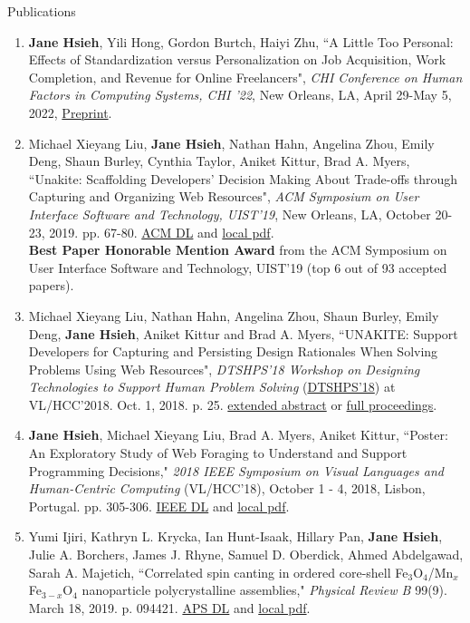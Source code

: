 \documentclass{resume}
\begin{document}
\begin{rSection}{Publications}
\begin{enumerate}
    \item \textbf{Jane Hsieh}, Yili Hong, Gordon Burtch, Haiyi Zhu, ``A Little Too Personal: Effects of Standardization versus Personalization on Job Acquisition, Work Completion, and Revenue for Online Freelancers", \textit{CHI Conference on Human Factors in Computing Systems, CHI ’22}, New Orleans, LA, April 29-May 5, 2022, \href{}{Preprint}.
    \item Michael Xieyang Liu, \textbf{Jane Hsieh}, Nathan Hahn, Angelina Zhou, Emily Deng, Shaun Burley, Cynthia Taylor, Aniket Kittur, Brad A. Myers, ``Unakite: Scaffolding Developers’ Decision Making About Trade-offs through Capturing and Organizing Web Resources", \textit{ACM Symposium on User Interface Software and Technology, UIST'19}, New Orleans, LA, October 20-23, 2019. pp. 67-80. \href{https://dl.acm.org/citation.cfm?id=3347908}{ACM DL} and \href{http://www.cs.cmu.edu/~NatProg/papers/p67-liu-Unakite-UIST.pdf}{local pdf}.\\
    \textbf{Best Paper Honorable Mention Award} from the ACM Symposium on User Interface Software and Technology, UIST'19 (top 6 out of 93 accepted papers). 
    \item Michael Xieyang Liu, Nathan Hahn, Angelina Zhou, Shaun Burley, Emily Deng, \textbf{Jane Hsieh}, Aniket Kittur and Brad A. Myers, ``UNAKITE: Support Developers for Capturing and Persisting Design Rationales When Solving Problems Using Web Resources", \textit{DTSHPS'18 Workshop on Designing Technologies to Support Human Problem Solving} (\href{https://www.cs.washington.edu/dtshps2018/index.html}{DTSHPS'18}) at VL/HCC'2018. Oct. 1, 2018. p. 25. \href{\myurl}{extended abstract} or \href{\myurl2}{full proceedings}.
    \item \textbf{Jane Hsieh}, Michael Xieyang Liu, Brad A. Myers, Aniket Kittur, ``Poster: An Exploratory Study of Web Foraging to Understand and Support Programming Decisions," \textit{2018 IEEE Symposium on Visual Languages and Human-Centric Computing} (VL/HCC'18), October 1 - 4, 2018, Lisbon, Portugal. pp. 305-306. \href{https://ieeexplore.ieee.org/document/8506517}{IEEE DL} and \href{http://www.cs.cmu.edu/~NatProg/papers/p305-hsieh.pdf}{local pdf}.
    \item Yumi Ijiri, Kathryn L. Krycka, Ian Hunt-Isaak, Hillary Pan, \textbf{Jane Hsieh}, Julie A. Borchers, James J. Rhyne, Samuel D. Oberdick, Ahmed Abdelgawad, Sarah A. Majetich, ``Correlated spin canting in ordered core-shell Fe$_3$O$_4$/Mn$_x$Fe$_{3-x}$O$_4$ nanoparticle polycrystalline assemblies," \textit{Physical Review B} 99(9). March 18, 2019. p. 094421. \href{https://journals.aps.org/prb/abstract/10.1103/PhysRevB.99.094421}{APS DL} and \href{https://janeon.github.io/assets/img/PhysRevB.99.094421.pdf}{local pdf}.


\end{enumerate}
\end{rSection}
\end{document}
